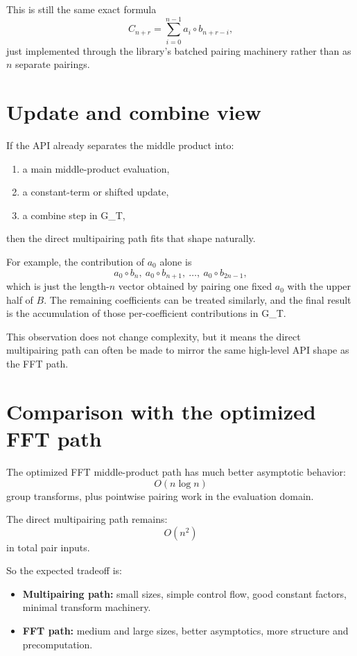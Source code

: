 \documentclass[11pt]{article}
\newcommand{\GT}{G_T}
\begin{document}
This is still the same exact formula
\[
C_{n+r} = \sum_{i=0}^{n-1} a_i \circ b_{n+r-i},
\]
just implemented through the library's batched pairing machinery rather than
as $n$ separate pairings.

\section{Update and combine view}

If the API already separates the middle product into:
\begin{enumerate}[itemsep=0.3em, topsep=0.4em]
  \item a main middle-product evaluation,
  \item a constant-term or shifted update,
  \item a combine step in \GT,
\end{enumerate}
then the direct multipairing path fits that shape naturally.

For example, the contribution of $a_0$ alone is
\[
a_0 \circ b_n,\ a_0 \circ b_{n+1},\ \dots,\ a_0 \circ b_{2n-1},
\]
which is just the length-$n$ vector obtained by pairing one fixed $a_0$ with
the upper half of $B$.
The remaining coefficients can be treated similarly, and the final result is
the accumulation of those per-coefficient contributions in \GT.

This observation does not change complexity, but it means the direct
multipairing path can often be made to mirror the same high-level API shape as
the FFT path.

\section{Comparison with the optimized FFT path}

The optimized FFT middle-product path has much better asymptotic behavior:
\[
O(n \log n)
\]
group transforms, plus pointwise pairing work in the evaluation domain.

The direct multipairing path remains:
\[
O(n^2)
\]
in total pair inputs.

So the expected tradeoff is:
\begin{itemize}[itemsep=0.3em, topsep=0.4em]
  \item \textbf{Multipairing path:} small sizes, simple control flow, good
  constant factors, minimal transform machinery.
  \item \textbf{FFT path:} medium and large sizes, better asymptotics, more
  structure and precomputation.
\end{itemize}
\end{document}
